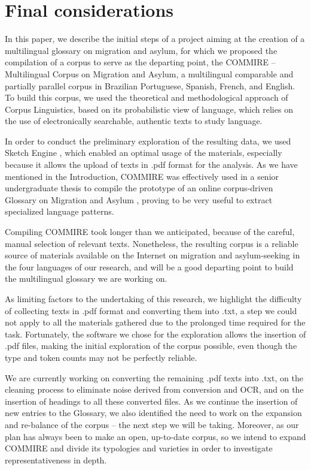 \documentclass[english]{textolivre}
\begin{document}
\section{Final considerations}

In this paper, we describe the initial steps of a project aiming at the creation of a multilingual glossary on migration and asylum, for which we proposed the compilation of a corpus to serve as the departing point, the COMMIRE – Multilingual Corpus on Migration and Asylum, a multilingual comparable and partially parallel corpus in Brazilian Portuguese, Spanish, French, and English. To build this corpus, we used the theoretical and methodological approach of Corpus Linguistics, based on its probabilistic view of language, which relies on the use of electronically searchable, authentic texts to study language.

In order to conduct the preliminary exploration of the resulting data, we used Sketch Engine \cite{kilgarriff_sketch_2004}, which enabled an optimal usage of the materials, especially because it allows the upload of texts in .pdf format for the analysis. As we have mentioned in the Introduction, COMMIRE was effectively used in a senior undergraduate thesis to compile the prototype of an online corpus-driven Glossary on Migration and Asylum \cite{furtado_glossario_2019}, proving to be very useful to extract specialized language patterns.

Compiling COMMIRE took longer than we anticipated, because of the careful, manual selection of relevant texts. Nonetheless, the resulting corpus is a reliable source of materials available on the Internet on migration and asylum-seeking in the four languages of our research, and will be a good departing point to build the multilingual glossary we are working on.

As limiting factors to the undertaking of this research, we highlight the difficulty of collecting texts in .pdf format and converting them into .txt, a step we could not apply to all the materials gathered due to the prolonged time required for the task. Fortunately, the software we chose for the exploration allows the insertion of .pdf files, making the initial exploration of the corpus possible, even though the type and token counts may not be perfectly reliable.

We are currently working on converting the remaining .pdf texts into .txt, on the cleaning process to eliminate noise derived from conversion and OCR, and on the insertion of headings to all these converted files. As we continue the insertion of new entries to the Glossary, we also identified the need to work on the expansion and re-balance of the corpus – the next step we will be taking. Moreover, as our plan has always been to make an open, up-to-date corpus, so we intend to expand COMMIRE and divide its typologies and varieties in order to investigate representativeness in depth.
\end{document}
